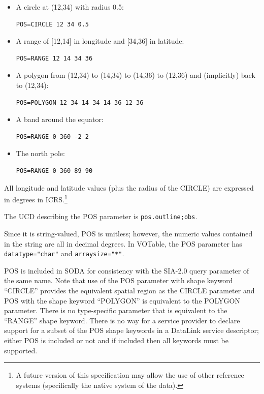 \documentclass[11pt,a4paper]{ivoa}
\newcommand{\ucd}[1]{\texttt{#1}}
\begin{document}
\begin{itemize}
\item A circle at (12,34) with radius 0.5:

\begin{lstlisting}
POS=CIRCLE 12 34 0.5
\end{lstlisting}

\item A range of [12,14] in longitude and [34,36] in latitude:

\begin{lstlisting}
POS=RANGE 12 14 34 36
\end{lstlisting}

\item A polygon from (12,34) to (14,34) to (14,36) to (12,36) and
(implicitly) back to (12,34):

\begin{lstlisting}
POS=POLYGON 12 34 14 34 14 36 12 36
\end{lstlisting}

\item A band around the equator:

\begin{lstlisting}
POS=RANGE 0 360 -2 2
\end{lstlisting}

\item The north pole:

\begin{lstlisting}
POS=RANGE 0 360 89 90
\end{lstlisting}
\end{itemize}

All longitude and latitude values (plus the radius of the
CIRCLE) are expressed in degrees in ICRS.\footnote{A future
version of this specification may allow the use of other
reference systems (specifically the native system of the
data).}

The UCD  describing the POS parameter is \ucd{pos.outline;obs}.

Since it is string-valued, POS is unitless; however, the numeric values
contained in the string are all in decimal degrees. In VOTable, the
POS parameter has \verb|datatype="char"| and \verb|arraysize="*"|.



POS is included in SODA  for consistency with the SIA-2.0
 query parameter of the same name. Note that use of the
POS parameter with shape keyword ``CIRCLE'' provides the equivalent
spatial region as the CIRCLE parameter and POS with the shape keyword
``POLYGON'' is equivalent to the POLYGON parameter. There is no
type-specific parameter that is equivalent to the ``RANGE'' shape
keyword. There is no way for a service provider to declare support for a
subset of the POS shape keywords in a DataLink
service descriptor; either POS is included or not and if included then
all keywords must be supported.
\end{document}
